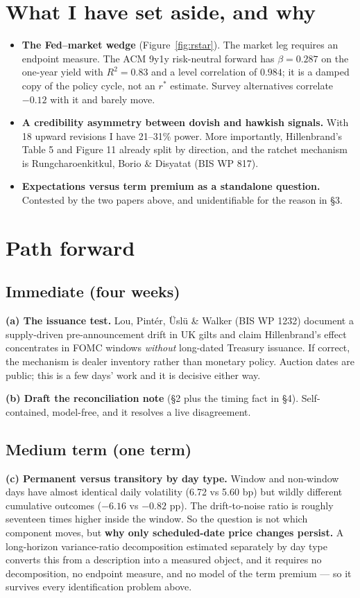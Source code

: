 \documentclass[11pt]{article}
\begin{document}
\section{What I have set aside, and why}

\begin{itemize}\setlength\itemsep{0.15em}
\item \textbf{The Fed--market wedge} (Figure~\ref{fig:rstar}). The market leg requires an endpoint measure. The ACM 9y1y risk-neutral forward has $\beta=0.287$ on the one-year yield with $R^2=0.83$ and a level correlation of $0.984$; it is a damped copy of the policy cycle, not an $r^{*}$ estimate. Survey alternatives correlate $-0.12$ with it and barely move.
\item \textbf{A credibility asymmetry between dovish and hawkish signals.} With 18 upward revisions I have 21--31\% power. More importantly, Hillenbrand's Table 5 and Figure 11 already split by direction, and the ratchet mechanism is Rungcharoenkitkul, Borio \& Disyatat (BIS WP 817).
\item \textbf{Expectations versus term premium as a standalone question.} Contested by the two papers above, and unidentifiable for the reason in \S3.
\end{itemize}

\section{Path forward}

\subsection*{Immediate (four weeks)}
\textbf{(a) The issuance test.} Lou, Pintér, Üslü \& Walker (BIS WP 1232) document a supply-driven pre-announcement drift in UK gilts and claim Hillenbrand's effect concentrates in FOMC windows \emph{without} long-dated Treasury issuance. If correct, the mechanism is dealer inventory rather than monetary policy. Auction dates are public; this is a few days' work and it is decisive either way.

\noindent\textbf{(b) Draft the reconciliation note} (\S2 plus the timing fact in \S4). Self-contained, model-free, and it resolves a live disagreement.

\subsection*{Medium term (one term)}
\textbf{(c) Permanent versus transitory by day type.} Window and non-window days have almost identical daily volatility (6.72 vs 5.60 bp) but wildly different cumulative outcomes ($-6.16$ vs $-0.82$ pp). The drift-to-noise ratio is roughly seventeen times higher inside the window. So the question is not which component moves, but \textbf{why only scheduled-date price changes persist.} A long-horizon variance-ratio decomposition estimated separately by day type converts this from a description into a measured object, and it requires no decomposition, no endpoint measure, and no model of the term premium --- so it survives every identification problem above.
\end{document}
